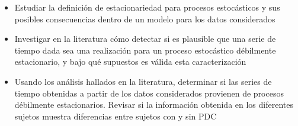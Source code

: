 \begin{itemize}
\item Estudiar la definici\'on de estacionariedad para procesos estoc\'asticos y sus posibles 
consecuencias dentro de un modelo para los datos considerados

\item Investigar en la literatura c\'omo detectar si es plausible que una serie de tiempo dada sea 
una realizaci\'on para un proceso estoc\'astico d\'ebilmente estacionario, y bajo qu\'e supuestos 
es v\'alida esta caracterizaci\'on

\item Usando los an\'alisis hallados en la literatura, determinar si las series de tiempo 
obtenidas a partir de los datos considerados provienen de procesos d\'ebilmente estacionarios.
Revisar si la informaci\'on obtenida en los diferentes sujetos muestra diferencias entre sujetos 
con y sin PDC
\end{itemize}

